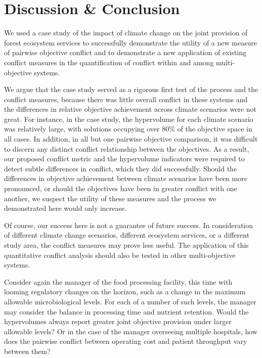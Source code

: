 \section{Discussion \& Conclusion}
We used a case study of the impact of climate change on the joint provision of forest ecosystem services to successfully demonstrate the utility of a new measure of pairwise objective conflict and to demonstrate a new application of existing conflict measures in the quantification of conflict within and among multi-objective systems.

We argue that the case study served as a rigorous first test of the process and the conflict measures, because there was little overall conflict in these systems and the differences in relative objective achievement across climate scenarios were not great. For instance, in the case study, the hypervolume for each climate scenario was relatively large, with solutions occupying over 80\% of the objective space in all cases. In addition, in all but one pairwise objective comparison, it was difficult to discern any distinct conflict relationship between the objectives. As a result, our proposed conflict metric and the hypervolume indicators were required to detect subtle differences in conflict, which they did successfully. Should the differences in objective achievement between climate scenarios have been more pronounced, or should the objectives have been in greater conflict with one another, we suspect the utility of these measures and the process we demonstrated here would only increase.

Of course, our success here is not a guarantee of future success. In consideration of different climate change scenarios, different ecosystem services, or a different study area, the conflict measures may prove less useful. The application of this quantitative conflict analysis should also be tested in other multi-objective systems.

Consider again the manager of the food processing facility, this time with looming regulatory changes on the horizon, such as a change in the maximum allowable microbiological levels. For each of a number of such levels, the manager may consider the balance in processing time and nutrient retention. Would the hypervolumes always report greater joint objective provision under larger allowable levels? Or in the case of the manager overseeing multiple hospitals, how does the pairwise conflict between operating cost and patient throughput vary between them?

